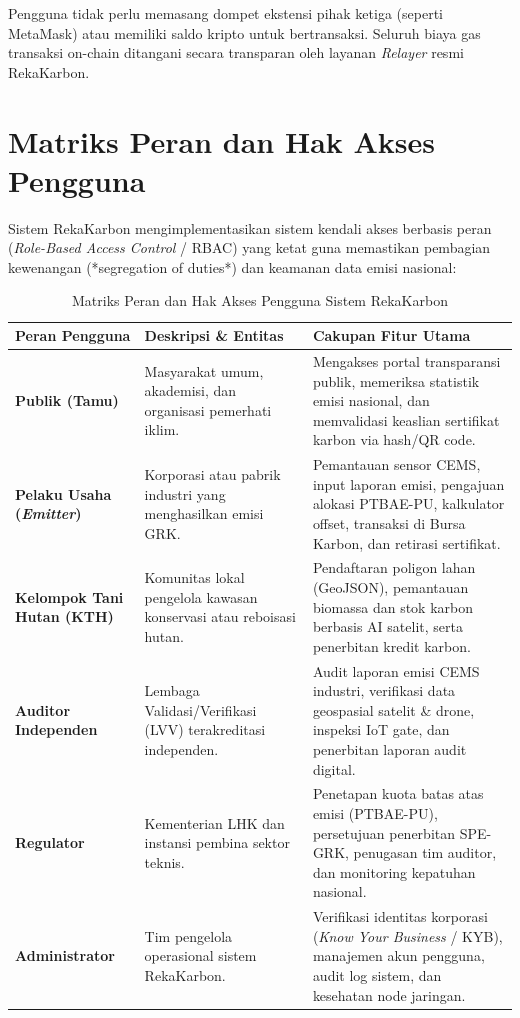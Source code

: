 \begin{tipbox}
Pengguna tidak perlu memasang dompet ekstensi pihak ketiga (seperti MetaMask) atau memiliki saldo kripto untuk bertransaksi. Seluruh biaya gas transaksi on-chain ditangani secara transparan oleh layanan \textit{Relayer} resmi RekaKarbon.
\end{tipbox}

\section{Matriks Peran dan Hak Akses Pengguna}

Sistem RekaKarbon mengimplementasikan sistem kendali akses berbasis peran (\textit{Role-Based Access Control} / RBAC) yang ketat guna memastikan pembagian kewenangan (*segregation of duties*) dan keamanan data emisi nasional:

\begin{table}[H]
\centering
\small
\renewcommand{\arraystretch}{1.25}
\begin{tabular}{|p{3.2cm}|p{5.0cm}|p{5.5cm}|}
\hline
\rowcolor{lightgreen}
\textbf{Peran Pengguna} & \textbf{Deskripsi \& Entitas} & \textbf{Cakupan Fitur Utama} \\
\hline
\textbf{Publik (Tamu)} & Masyarakat umum, akademisi, dan organisasi pemerhati iklim. & Mengakses portal transparansi publik, memeriksa statistik emisi nasional, dan memvalidasi keaslian sertifikat karbon via hash/QR code. \\
\hline
\textbf{Pelaku Usaha (\textit{Emitter})} & Korporasi atau pabrik industri yang menghasilkan emisi GRK. & Pemantauan sensor CEMS, input laporan emisi, pengajuan alokasi PTBAE-PU, kalkulator offset, transaksi di Bursa Karbon, dan retirasi sertifikat. \\
\hline
\textbf{Kelompok Tani Hutan (KTH)} & Komunitas lokal pengelola kawasan konservasi atau reboisasi hutan. & Pendaftaran poligon lahan (GeoJSON), pemantauan biomassa dan stok karbon berbasis AI satelit, serta penerbitan kredit karbon. \\
\hline
\textbf{Auditor Independen} & Lembaga Validasi/Verifikasi (LVV) terakreditasi independen. & Audit laporan emisi CEMS industri, verifikasi data geospasial satelit \& drone, inspeksi IoT gate, dan penerbitan laporan audit digital. \\
\hline
\textbf{Regulator} & Kementerian LHK dan instansi pembina sektor teknis. & Penetapan kuota batas atas emisi (PTBAE-PU), persetujuan penerbitan SPE-GRK, penugasan tim auditor, dan monitoring kepatuhan nasional. \\
\hline
\textbf{Administrator} & Tim pengelola operasional sistem RekaKarbon. & Verifikasi identitas korporasi (\textit{Know Your Business} / KYB), manajemen akun pengguna, audit log sistem, dan kesehatan node jaringan. \\
\hline
\end{tabular}
\caption{Matriks Peran dan Hak Akses Pengguna Sistem RekaKarbon}
\label{tab:role-matrix}
\end{table}

